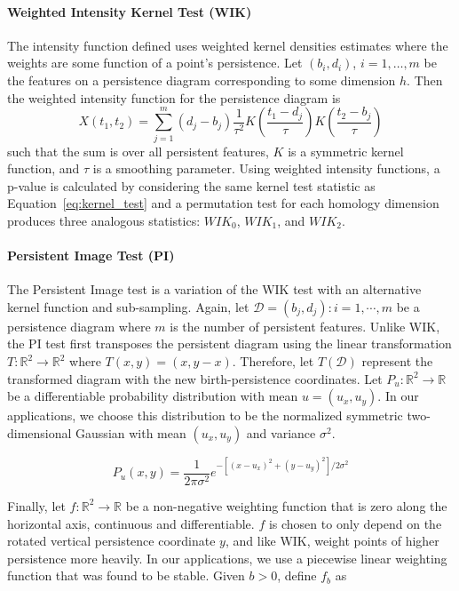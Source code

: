 \documentclass[12pt]{article}
\begin{document}

\paragraph{Weighted Intensity Kernel Test (WIK)}
The intensity function defined \citep{chen2015statistical} uses weighted kernel densities estimates where the weights are some function of a point's persistence. Let $(b_i, d_i)$, $i = 1, \ldots, m$ be the features on a persistence diagram corresponding to some dimension $h$.  Then the weighted intensity function for the persistence diagram is
%
\[ X(t_1, t_2) = \sum_{j=1}^m(d_{j} - b_{j})\frac{1}{\tau^{2}}K \left(\frac{t_1-d_{j}}{\tau}\right)K \left(\frac{t_2-b_{j}}{\tau}\right)\]
%
such that the sum is over all persistent features, $K$ is a symmetric kernel function, and $\tau$ is a smoothing parameter.
Using weighted intensity functions, a p-value is calculated by considering the same kernel test statistic as Equation~\eqref{eq:kernel_test} and a permutation test for each homology dimension produces three analogous statistics: $WIK_0$, $WIK_1$, and $WIK_2$.

\paragraph{Persistent Image Test (PI)} The Persistent Image test \citep{adams2015persistent} is a variation of the WIK test with an alternative kernel function and sub-sampling. Again, let $\mathcal{D} = {(b_{j} , d_{j}) : i = 1, \cdots ,m}$ be a persistence diagram where $m$ is the number of persistent features. Unlike WIK, the PI test first transposes the persistent diagram using the linear transformation $T: \mathbb{R}^{2} \rightarrow \mathbb{R}^{2}$ where $T(x,y) = (x, y-x)$. Therefore, let $T(\mathcal{D})$ represent the transformed diagram with the new birth-persistence coordinates. Let $P_{u} : \mathbb{R}^{2} \rightarrow \mathbb{R}$ be a differentiable probability distribution with mean $u = (u_{x}, u_{y})$. In our applications, we choose this distribution to be the normalized symmetric two-dimensional Gaussian with mean $(u_{x}, u_{y})$ and variance $\sigma^{2}$.

\[ P_{u}(x,y) = \frac{1}{2\pi\sigma^{2}}e^{-[(x - u_{x})^{2} + (y-u_{y})^{2}]/2\sigma^{2}} \]

Finally, let $f : \mathbb{R}^{2} \rightarrow \mathbb{R}$ be a non-negative weighting function that is zero along the horizontal axis, continuous and differentiable. $f$ is chosen to only depend on the rotated vertical persistence coordinate $y$, and like WIK, weight points of higher persistence more heavily. In our applications, we use a piecewise linear weighting function that was found to be stable. Given $b > 0$, define $f_{b}$ as
\end{document}
